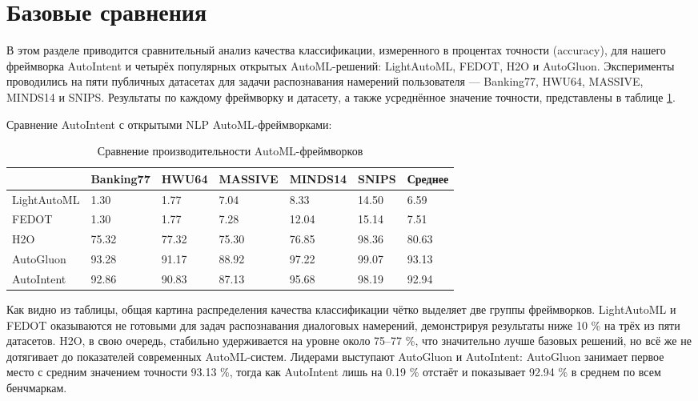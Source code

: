 \documentclass[14pt,a4paper,oneside,openany]{extbook}
\begin{document}
\section{Базовые сравнения}
\label{sec:org510f5eb}

В этом разделе приводится сравнительный анализ качества классификации, измеренного в процентах точности (accuracy), для нашего фреймворка AutoIntent и четырёх популярных открытых AutoML-решений: LightAutoML, FEDOT, H2O и AutoGluon. Эксперименты проводились на пяти публичных датасетах для задачи распознавания намерений пользователя — Banking77, HWU64, MASSIVE, MINDS14 и SNIPS. Результаты по каждому фреймворку и датасету, а также усреднённое значение точности, представлены в таблице \ref{tbl:frameworks_comparison}.

Сравнение AutoIntent с открытыми NLP AutoML-фреймворками:

\begin{table}[h!]
\caption{\label{tbl:frameworks_comparison}Сравнение производительности AutoML-фреймворков}
\centering
\begin{tabular}{|p{3cm}|p{2cm}|p{2cm}|p{2cm}|p{2cm}|p{1cm}|p{2cm}|}
\hline
 & Banking77 & HWU64 & MASSIVE & MINDS14 & SNIPS & Среднее\\
\hline
LightAutoML & 1.30 & 1.77 & 7.04 & 8.33 & 14.50 & 6.59\\
\hline
FEDOT & 1.30 & 1.77 & 7.28 & 12.04 & 15.14 & 7.51\\
\hline
H2O & 75.32 & 77.32 & 75.30 & 76.85 & 98.36 & 80.63\\
\hline
AutoGluon & 93.28 & 91.17 & 88.92 & 97.22 & 99.07 & 93.13\\
\hline
AutoIntent & 92.86 & 90.83 & 87.13 & 95.68 & 98.19 & 92.94\\
\hline
\end{tabular}
\end{table}

Как видно из таблицы, общая картина распределения качества классификации чётко выделяет две группы фреймворков. LightAutoML и FEDOT оказываются не готовыми для задач распознавания диалоговых намерений, демонстрируя результаты ниже 10 \% на трёх из пяти датасетов. H2O, в свою очередь, стабильно удерживается на уровне около 75–77 \%, что значительно лучше базовых решений, но всё же не дотягивает до показателей современных AutoML-систем. Лидерами выступают AutoGluon и AutoIntent: AutoGluon занимает первое место с средним значением точности 93.13 \%, тогда как AutoIntent лишь на 0.19 \% отстаёт и показывает 92.94 \% в среднем по всем бенчмаркам.
\end{document}

